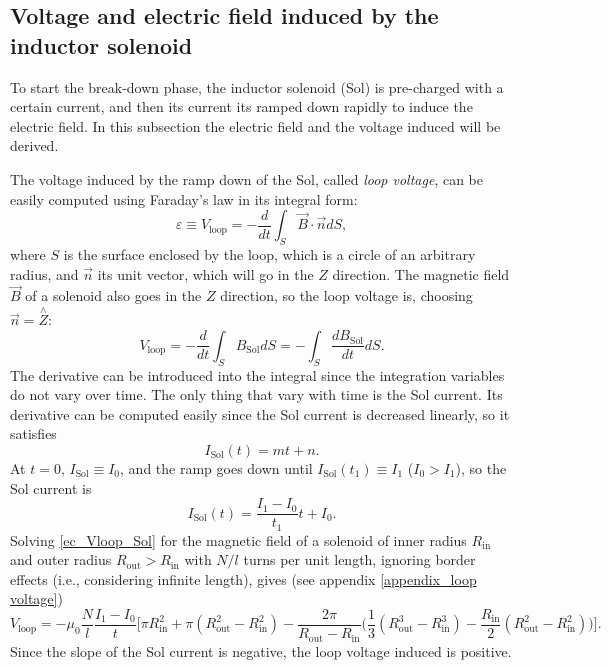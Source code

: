 \documentclass[a4paper,12pt,oneside]{book}
\begin{document}
\subsection{Voltage and electric field induced by the inductor solenoid}
\label{sec_loop_voltage_field_Sol_theory}

To start the break-down phase, the inductor solenoid (Sol) is pre-charged with a certain current, and then its current its ramped down rapidly to induce the electric field. In this subsection the electric field and the voltage induced will be derived.


The voltage induced by the ramp down of the Sol, called \textit{loop voltage}, can be easily computed using Faraday's law in its integral form:
%
\begin{equation}\label{ec_Faraday_loop}
\varepsilon \equiv V_\text{loop} = -\dfrac{d}{dt} \int_S \vec{B} \cdot \vec{n} dS,
\end{equation}
where $S$ is the surface enclosed by the loop, which is a circle of an arbitrary radius, and $\vec{n}$ its unit vector, which will go in the $Z$ direction. The magnetic field $\vec{B}$ of a solenoid also goes in the $Z$ direction, so the loop voltage is, choosing $\vec{n}=\stackrel{\wedge}{Z}$:
%
\begin{equation}\label{ec_Vloop_Sol}
V_\text{loop} = - \dfrac{d}{dt} \int_S B_\text{Sol} dS= - \int_S \dfrac{d B_\text{Sol}}{dt} dS.
\end{equation}
The derivative can be introduced into the integral since the integration variables do not vary over time. The only thing that vary with time is the Sol current. Its derivative can be computed easily since the Sol current is decreased linearly, so it satisfies
%
\begin{equation}
I_\text{Sol}(t)=m t +n.
\end{equation}
At $t=0$, $I_\text{Sol} \equiv I_0$, and the ramp goes down until $I_\text{Sol}(t_1) \equiv  I_1$ ($I_0>I_1$), so the Sol current is
%
\begin{equation}
I_\text{Sol}(t)=\dfrac{I_1-I_0}{t_1} t +I_0.
\end{equation}
Solving \eqref{ec_Vloop_Sol} for the magnetic field of a solenoid of inner radius $R_\text{in}$ and outer radius $R_\text{out}>R_\text{in}$ with $N/l$ turns per unit length, ignoring border effects (i.e., considering infinite length), gives (see appendix \ref{appendix_loop voltage})
\begin{equation}
V_\text{loop}= - \mu_0 \dfrac{N}{l} \dfrac{I_1-I_0}{t} \Big[ \pi R_\text{in}^2  + \pi (R_\text{out}^2-R_\text{in}^2) - \dfrac{2 \pi}{R_\text{out}-R_\text{in}} \Big( \dfrac{1}{3} (R_\text{out}^3-R_\text{in}^3) - \dfrac{R_\text{in}}{2} (R_\text{out}^2-R_\text{in}^2) \Big) \Big].
\end{equation}
Since the slope of the Sol current is negative, the loop voltage induced is positive.
\end{document}
